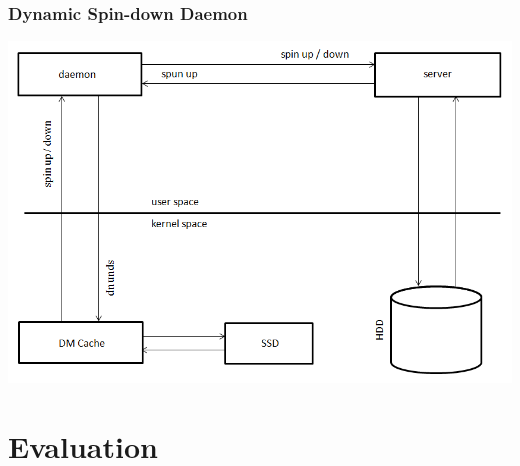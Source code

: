 \documentclass{beamer}
\begin{document}
\begin{frame}
  \frametitle{Dynamic Spin-down Daemon}

  \centering
  \includegraphics[height=0.8\textheight,keepaspectratio]{daemon.png}

\end{frame}

\section{Evaluation}
\end{document}
